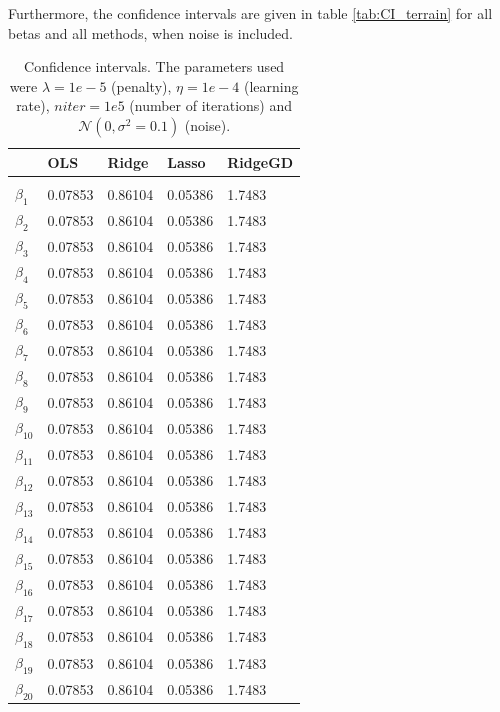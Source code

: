 Furthermore, the confidence intervals are given in table \eqref{tab:CI_terrain} for all betas and all methods, when noise is included.

\begin{table} [H]
	\caption{Confidence intervals. The parameters used were $\lambda=1e-5$ (penalty), $\eta=1e-4$ (learning rate), $niter=1e5$ (number of iterations) and $\mathcal{N}(0, \sigma^2=0.1)$ (noise).  \vspace{2mm}}
	\begin{tabularx}{\textwidth}{l|XXXX} \hline\hline
		\label{tab:CI_terrain}
		&\textbf{OLS}&\textbf{Ridge}&\textbf{Lasso}&\textbf{RidgeGD}\\ \hline \\
		$\beta_1$ & 0.07853 & 0.86104 & 0.05386 & 1.7483\\
		$\beta_2$ & 0.07853 & 0.86104 & 0.05386 & 1.7483\\
		$\beta_3$ & 0.07853 & 0.86104 & 0.05386 & 1.7483\\
		$\beta_4$ & 0.07853 & 0.86104 & 0.05386 & 1.7483\\
		$\beta_5$ & 0.07853 & 0.86104 & 0.05386 & 1.7483\\
		$\beta_6$ & 0.07853 & 0.86104 & 0.05386 & 1.7483\\
		$\beta_7$ & 0.07853 & 0.86104 & 0.05386 & 1.7483\\
		$\beta_8$ & 0.07853 & 0.86104 & 0.05386 & 1.7483\\
		$\beta_9$ & 0.07853 & 0.86104 & 0.05386 & 1.7483\\
		$\beta_{10}$ & 0.07853 & 0.86104 & 0.05386 & 1.7483\\
		$\beta_{11}$ & 0.07853 & 0.86104 & 0.05386 & 1.7483\\
		$\beta_{12}$ & 0.07853 & 0.86104 & 0.05386 & 1.7483\\
		$\beta_{13}$ & 0.07853 & 0.86104 & 0.05386 & 1.7483\\
		$\beta_{14}$ & 0.07853 & 0.86104 & 0.05386 & 1.7483\\
		$\beta_{15}$ & 0.07853 & 0.86104 & 0.05386 & 1.7483\\
		$\beta_{16}$ & 0.07853 & 0.86104 & 0.05386 & 1.7483\\
		$\beta_{17}$ & 0.07853 & 0.86104 & 0.05386 & 1.7483\\
		$\beta_{18}$ & 0.07853 & 0.86104 & 0.05386 & 1.7483\\
		$\beta_{19}$ & 0.07853 & 0.86104 & 0.05386 & 1.7483\\
		$\beta_{20}$ & 0.07853 & 0.86104 & 0.05386 & 1.7483\\

\end{tabularx}
\end{table}
